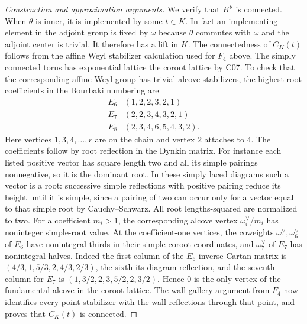 \documentclass[11pt,a4paper,openany,oneside]{book}
\theoremstyle{resultstyle}
\theoremstyle{definition}
\numberwithin{equation}{chapter}
\begin{document}
\begin{proof}[Construction and approximation arguments]
We verify that \(K^\theta\) is connected. When \(\theta\) is
inner, it is implemented by some \(t\in K\). In fact an
implementing element in the adjoint group is fixed by \(\omega\)
because \(\theta\) commutes with \(\omega\) and the adjoint center
is trivial. It therefore has a lift in \(K\). The connectedness
of \(C_K(t)\) follows from the affine Weyl stabilizer calculation
used for \(F_4\) above. The simply connected torus has exponential
lattice the coroot lattice by C07. To check that the corresponding
affine Weyl group has trivial alcove stabilizers, the highest root
coefficients in the Bourbaki numbering are
\[
  \begin{array}{c|l}
  E_6 &(1,2,2,3,2,1)\\
  E_7 &(2,2,3,4,3,2,1)\\
  E_8 &(2,3,4,6,5,4,3,2).
  \end{array}
\]
Here vertices \(1,3,4,\ldots,r\) are on the chain and vertex
\(2\) attaches to \(4\). The coefficients follow by root
reflection in the Dynkin matrix. For instance each listed
positive vector has square length two and all its simple
pairings nonnegative, so it is the dominant root. In these
simply laced diagrams such a vector is a root: successive
simple reflections with positive pairing reduce its height
until it is simple, since a pairing of two can occur only
for a vector equal to that simple root by Cauchy--Schwarz.
All root lengths-squared are normalized to two.
For a coefficient \(m_i>1\), the corresponding alcove vertex
\(\omega_i^\vee/m_i\) has noninteger simple-root value. At
the coefficient-one vertices, the coweights
\(\omega_1^\vee,\omega_6^\vee\) of \(E_6\) have nonintegral
thirds in their simple-coroot coordinates, and
\(\omega_7^\vee\) of \(E_7\) has nonintegral halves.
Indeed the first column of the \(E_6\) inverse Cartan matrix is
\((4/3,1,5/3,2,4/3,2/3)\), the sixth its diagram reflection,
and the seventh column for \(E_7\) is
\((1,3/2,2,3,5/2,2,3/2)\).
Hence \(0\) is the only vertex of the fundamental alcove in the
coroot lattice. The wall-gallery argument from \(F_4\) now
identifies every point stabilizer with the wall reflections
through that point, and proves that \(C_K(t)\) is connected.


\end{proof}
\end{document}
